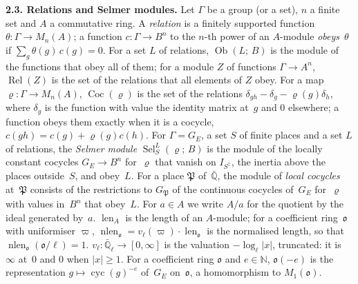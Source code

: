 \documentclass[11pt,a4paper]{article}
\newcommand{\len}{\operatorname{len}}
\newcommand{\m}[1]{\mbox{$#1$}}        %
\newcommand{\subhead}[1]{\par\addvspace{9pt plus 2pt}\Needspace{4\baselineskip}\noindent\textbf{#1}\enspace\ignorespaces}
\theoremstyle{plainx}
\theoremstyle{uprightx}
\newcommand{\NN}{\mathbb{N}}
\newcommand{\Qb}{\bar{\mathbb{Q}}}
\newcommand{\Qlb}{\bar{\mathbb{Q}}_\ell}
\newcommand{\GE}[1]{G_{#1}}
\newcommand{\cyc}{\operatorname{cyc}}
\newcommand{\vl}{v_\ell}
\newcommand{\Sel}[4]{\operatorname{Sel}_{#2}^{#3}(#1;\,#4)}
\newcommand{\Ob}[2]{\operatorname{Ob}(#1;\,#2)}
\newcommand{\Coc}[1]{\operatorname{Coc}(#1)}
\newcommand{\Rel}[1]{\operatorname{Rel}(#1)}
\newcommand{\inab}[1]{I_{#1}}
\newcommand{\nlen}{\operatorname{nlen}}
\newcommand{\fo}{\mathfrak{o}}
\newcommand{\fP}{\mathfrak{P}}
\begin{document}
\subhead{2.3. Relations and Selmer modules.} Let $\Gamma$ be a group (or a set), $n$ a finite set and $A$ a
commutative ring. A \emph{relation} is a finitely supported function \m{\theta\colon\Gamma\to M_n(A)}; a function
\m{c\colon\Gamma\to B^n} to the $n$-th power of an $A$-module \emph{obeys}~$\theta$ if
\m{\sum_{g}\theta(g)\,c(g)=0}. For a set $L$ of relations, \m{\Ob{L}{B}} is the module of the functions that obey
all of them; for a module $Z$ of functions \m{\Gamma\to A^n}, \m{\Rel{Z}} is the set of the relations that all
elements of $Z$ obey. For a map \m{\varrho\colon\Gamma\to M_n(A)}, \m{\Coc{\varrho}} is the set of the relations
\m{\delta_{gh}-\delta_g-\varrho(g)\delta_h}, where $\delta_g$ is the function with value the identity matrix
at~$g$ and $0$ elsewhere; a function obeys them exactly when it is a cocycle, \m{c(gh)=c(g)+\varrho(g)c(h)}. For
\m{\Gamma=\GE{E}}, a set $S$ of finite places and a set $L$ of relations, the \emph{Selmer module}
\m{\Sel{\varrho}{S}{L}{B}} is the module of the locally constant cocycles \m{\GE{E}\to B^n} for~$\varrho$ that
vanish on \m{\inab{S^{\complement}}}, the inertia above the places outside~$S$, and obey~$L$. For a place $\fP$
of~\m{\Qb}, the module of \emph{local cocycles} at~$\fP$ consists of the restrictions to \m{G_{\fP}} of the
continuous cocycles of~\m{\GE{E}} for~$\varrho$ with values in~$B^n$ that obey~$L$. For \m{a\in A} we write \m{A/a}
for the quotient by the ideal generated by~$a$. \m{\len_A} is the length of an $A$-module; for a coefficient
ring~$\fo$ with uniformiser $\varpi$, \m{\nlen_{\fo}=\vl(\varpi)\cdot\len_{\fo}} is the normalised length, so
that \m{\nlen_{\fo}(\fo/\ell)=1}. \m{\vl\colon\Qlb\to[0,\infty]} is the valuation \m{-\log_\ell|x|}, truncated: it is
$\infty$ at~$0$ and $0$ when \m{|x|\ge1}. For a coefficient ring $\fo$ and \m{e\in\NN}, \m{\fo(-e)} is the
representation \m{g\mapsto\cyc(g)^{-e}} of~\m{\GE{E}} on~$\fo$, a homomorphism to \m{M_1(\fo)}.
\end{document}
